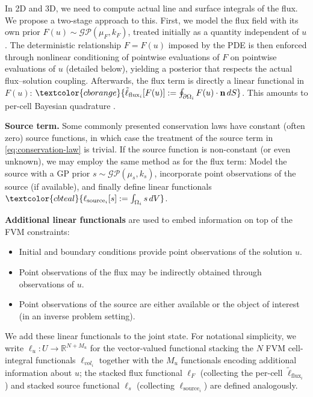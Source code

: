 \documentclass{article}
\theoremstyle{plain}
\theoremstyle{definition}
\theoremstyle{remark}
\newcommand{\termflux}[1]{\textcolor{cborange}{#1}}
\newcommand{\termsource}[1]{\textcolor{cbteal}{#1}}
\newcommand{\R}{\mathbb{R}}
\newcommand{\GP}{\mathcal{GP}}
\begin{document}
In 2D and 3D, we need to compute actual line and surface integrals of the flux.
We propose a two-stage approach to this.
First, we model the flux field with its own prior $F(u) \sim \mathcal{GP}(\mu_F, k_F)$, treated initially as a quantity independent of $u$.
The deterministic relationship $F = F(u)$ imposed by the PDE is then enforced through nonlinear conditioning of pointwise evaluations of $F$ on pointwise evaluations of $u$ (detailed below), yielding a posterior that respects the actual flux--solution coupling.
Afterwards, the flux term is directly a linear functional in $F(u)$: $\termflux{\tilde{\ell}_{\text{flux}_i}[F(u)] := \oint_{\partial\Omega_i} F(u) \cdot \mathbf{n} \, dS}$.
This amounts to per-cell Bayesian quadrature \citep{ohaganBayesHermiteQuadrature1991}.


\textbf{Source term.}
Some commonly presented conservation laws have constant (often zero) source functions, in which case the treatment of the \termsource{source term} in \cref{eq:conservation-law} is trivial.
If the source function is non-constant (or even unknown), we may employ the same method as for the flux term:
Model the source with a GP prior $s \sim \GP(\mu_s, k_s)$, incorporate point observations of the source (if available), and finally define linear functionals $\termsource{\ell_{\text{source}_i}[s] := \int_{\Omega_i} s \, dV}$.

\textbf{Additional linear functionals} are used to embed information on top of the FVM constraints:
\begin{itemize}[nosep]
  \item Initial and boundary conditions provide point observations of the solution $u$.
  \item Point observations of the flux may be indirectly obtained through observations of $u$.
  \item Point observations of the source are either available or the object of interest (in an inverse problem setting).
\end{itemize}
We add these linear functionals to the joint state.
For notational simplicity, we write $\bm{\ell}_u : U \rightarrow \R^{N + M_u}$ for the vector-valued functional stacking the $N$ FVM cell-integral functionals $\ell_{vol_i}$ together with the $M_u$ functionals encoding additional information about $u$; the stacked flux functional $\bm{\ell}_F$ (collecting the per-cell $\tilde{\ell}_{\text{flux}_i}$) and stacked source functional $\bm{\ell}_s$ (collecting $\ell_{\text{source}_i}$) are defined analogously.
\end{document}
